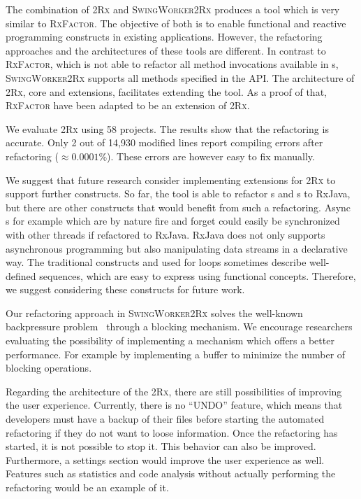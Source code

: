 \documentclass[type=bsc,accentcolor=tud9c]{tudthesis}
\newcommand{\framework}[1]{\textcolor{black!65}{#1}}
\newcommand{\toolcore}{\textsc{2Rx}}
\newcommand{\toolextension}{\textsc{SwingWorker2Rx}}
\begin{document}
The combination of \toolcore{} and \toolextension{} produces a tool which is very similar to \textsc{RxFactor}. The objective of both is to enable functional and reactive programming constructs in existing applications. However, the refactoring approaches and the architectures of these tools are different. In contrast to \textsc{RxFactor}, which is not able to refactor all method invocations available in s, \toolextension{} supports all methods specified in the  API. The architecture of \toolcore{}, core and extensions, facilitates extending the tool. As a proof of that, \textsc{RxFactor} have been adapted to be an extension of \toolcore{}.

We evaluate \toolcore{} using 58 projects. The results show that the refactoring is accurate. Only 2 out of 14,930 modified lines report compiling errors after refactoring ($\approx 0.0001\%$). These errors are however easy to fix manually.

We suggest that future research consider implementing extensions for \toolcore{} to support further constructs. So far, the tool is able to refactor s and s to \framework{RxJava}, but there are other constructs that would benefit from such a refactoring. Async s for example which are by nature fire and forget could easily be synchronized with other threads if refactored to \framework{RxJava}. \framework{RxJava} does not only supports asynchronous programming but also manipulating data streams in a declarative way. The traditional constructs  and  used for loops sometimes describe well-defined sequences, which are easy to express using functional concepts. Therefore, we suggest considering these constructs for future work.

Our refactoring approach in \toolextension{} solves the well-known backpressure problem~\cite{rxJavaBackpressure} through a blocking mechanism. We encourage researchers evaluating the possibility of implementing a mechanism which offers a better performance. For example by implementing a buffer to minimize the number of blocking operations.

Regarding the architecture of the \toolcore{}, there are still possibilities of improving the user experience. Currently, there is no ``UNDO'' feature, which means that developers must have a backup of their files before starting the automated refactoring if they do not want to loose information. Once the refactoring has started, it is not possible to stop it.  This behavior can also be improved. Furthermore, a settings section would improve the user experience as well. Features such as statistics and code analysis without actually performing the refactoring would be an example of it.
\end{document}
